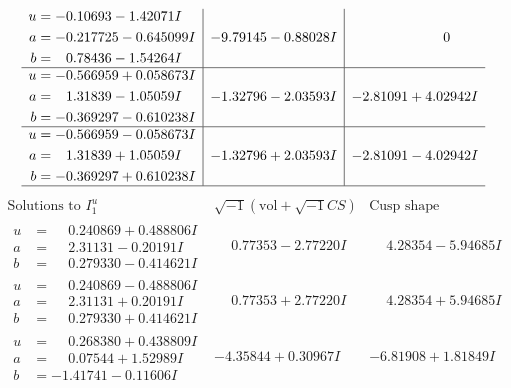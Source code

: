 \documentclass[1p]{elsarticle_modified}
\theoremstyle{definition}
\newcommand{\I}{\sqrt{-1}}
\begin{document}
$$\begin{array}{c|c|c}
\begin{aligned}
u &= -0.10693 - 1.42071 I \\
a &= -0.217725 - 0.645099 I \\
b &= \phantom{-}0.78436 - 1.54264 I\end{aligned}
 & -9.79145 - 0.88028 I & \phantom{-0.000000 } 0 \\ \hline\begin{aligned}
u &= -0.566959 + 0.058673 I \\
a &= \phantom{-}1.31839 - 1.05059 I \\
b &= -0.369297 - 0.610238 I\end{aligned}
 & -1.32796 - 2.03593 I & -2.81091 + 4.02942 I \\ \hline\begin{aligned}
u &= -0.566959 - 0.058673 I \\
a &= \phantom{-}1.31839 + 1.05059 I \\
b &= -0.369297 + 0.610238 I\end{aligned}
 & -1.32796 + 2.03593 I & -2.81091 - 4.02942 I\\
 \hline 
 \end{array}$$\newpage$$\begin{array}{c|c|c}  
\text{Solutions to }I^u_{1}& \I (\text{vol} + \sqrt{-1}CS) & \text{Cusp shape}\\
 \hline 
\begin{aligned}
u &= \phantom{-}0.240869 + 0.488806 I \\
a &= \phantom{-}2.31131 - 0.20191 I \\
b &= \phantom{-}0.279330 - 0.414621 I\end{aligned}
 & \phantom{-}0.77353 - 2.77220 I & \phantom{-}4.28354 - 5.94685 I \\ \hline\begin{aligned}
u &= \phantom{-}0.240869 - 0.488806 I \\
a &= \phantom{-}2.31131 + 0.20191 I \\
b &= \phantom{-}0.279330 + 0.414621 I\end{aligned}
 & \phantom{-}0.77353 + 2.77220 I & \phantom{-}4.28354 + 5.94685 I \\ \hline\begin{aligned}
u &= \phantom{-}0.268380 + 0.438809 I \\
a &= \phantom{-}0.07544 + 1.52989 I \\
b &= -1.41741 - 0.11606 I\end{aligned}
 & -4.35844 + 0.30967 I & -6.81908 + 1.81849 I \\ \hline\begin{aligned}

\end{aligned}
\end{array}$$
\end{document}
